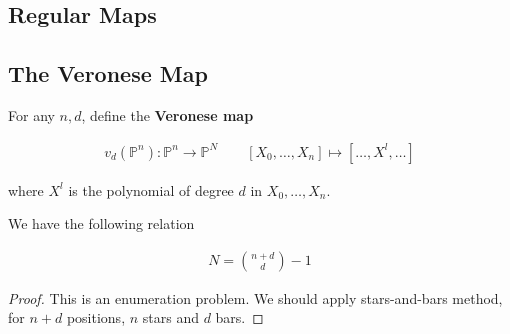 \documentclass[Total.tex]{subfiles}
\begin{document}
			\subsection{Regular Maps}
			
			
			
				
				
			\subsection{The Veronese Map}
			
				\begin{Def}
					For any $n,d$, define the \textbf{Veronese map}
					
					\begin{gather*}
						v_d(\mathbb{P}^n):\mathbb{P}^n\rightarrow \mathbb{P}^N\qquad [X_0,\dots,X_n]\mapsto [\dots,X^l,\dots]
					\end{gather*}
					
					where $X^l$ is the polynomial of degree $d$ in $X_0,\dots,X_n$. 
				\end{Def}
				
				\begin{lemma}
					We have the following relation 
					
					\begin{gather*}
						N=\binom{n+d}{d}-1
					\end{gather*}
				\end{lemma}
				
				\begin{proof}
					This is an enumeration problem. We should apply stars-and-bars method, for $n+d$ positions, $n$ stars and $d$ bars.
				\end{proof}
				
\end{document}
